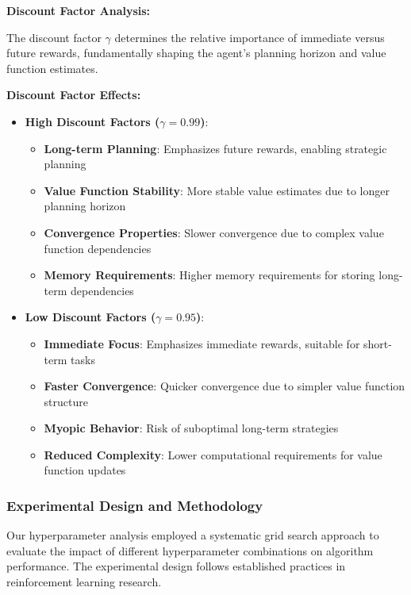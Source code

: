 \documentclass[12pt]{article}
\begin{document}
{{{\textbf{Discount Factor Analysis:}

The discount factor $\gamma$ determines the relative importance of immediate versus future rewards, fundamentally shaping the agent's planning horizon and value function estimates.

\textbf{Discount Factor Effects:}
\begin{itemize}
    \item \textbf{High Discount Factors ($\gamma = 0.99$)}:
    \begin{itemize}
        \item \textbf{Long-term Planning}: Emphasizes future rewards, enabling strategic planning
        \item \textbf{Value Function Stability}: More stable value estimates due to longer planning horizon
        \item \textbf{Convergence Properties}: Slower convergence due to complex value function dependencies
        \item \textbf{Memory Requirements}: Higher memory requirements for storing long-term dependencies
    \end{itemize}
    
    \item \textbf{Low Discount Factors ($\gamma = 0.95$)}:
    \begin{itemize}
        \item \textbf{Immediate Focus}: Emphasizes immediate rewards, suitable for short-term tasks
        \item \textbf{Faster Convergence}: Quicker convergence due to simpler value function structure
        \item \textbf{Myopic Behavior}: Risk of suboptimal long-term strategies
        \item \textbf{Reduced Complexity}: Lower computational requirements for value function updates
    \end{itemize}
\end{itemize}

\subsubsection{Experimental Design and Methodology}

Our hyperparameter analysis employed a systematic grid search approach to evaluate the impact of different hyperparameter combinations on algorithm performance. The experimental design follows established practices in reinforcement learning research.

}}}
\end{document}
